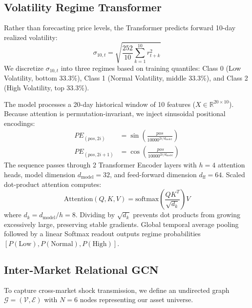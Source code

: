 \documentclass[10pt,twocolumn,letterpaper]{article}
\begin{document}
\subsection{Volatility Regime Transformer}
Rather than forecasting price levels, the Transformer predicts forward 10-day realized volatility:
\begin{equation}
    \sigma_{10, t} = \sqrt{\frac{252}{10}\sum_{k=1}^{10} r_{t+k}^2}
\end{equation}
We discretize $\sigma_{10, t}$ into three regimes based on training quantiles: Class 0 (Low Volatility, bottom 33.3\%), Class 1 (Normal Volatility, middle 33.3\%), and Class 2 (High Volatility, top 33.3\%).

The model processes a 20-day historical window of 10 features ($X \in \mathbb{R}^{20 \times 10}$). Because attention is permutation-invariant, we inject sinusoidal positional encodings:
\begin{align}
    PE_{(pos, 2i)} &= \sin\left(\frac{pos}{10000^{2i/d_{\text{model}}}}\right) \\
    PE_{(pos, 2i+1)} &= \cos\left(\frac{pos}{10000^{2i/d_{\text{model}}}}\right)
\end{align}
The sequence passes through 2 Transformer Encoder layers with $h = 4$ attention heads, model dimension $d_{\text{model}} = 32$, and feed-forward dimension $d_{\text{ff}} = 64$. Scaled dot-product attention computes:
\begin{equation}
    \text{Attention}(Q, K, V) = \text{softmax}\left(\frac{QK^T}{\sqrt{d_k}}\right)V
\end{equation}
where $d_k = d_{\text{model}} / h = 8$. Dividing by $\sqrt{d_k}$ prevents dot products from growing excessively large, preserving stable gradients. Global temporal average pooling followed by a linear Softmax readout outputs regime probabilities $[P(\text{Low}), P(\text{Normal}), P(\text{High})]$.

\subsection{Inter-Market Relational GCN}
To capture cross-market shock transmission, we define an undirected graph $\mathcal{G} = (\mathcal{V}, \mathcal{E})$ with $N = 6$ nodes representing our asset universe.
\end{document}
